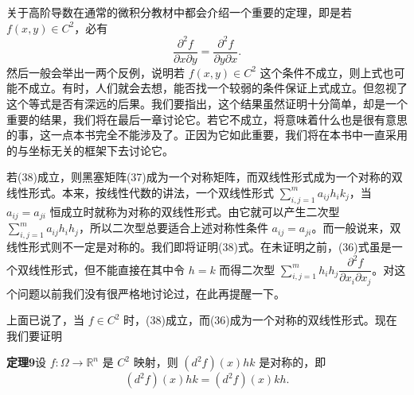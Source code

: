 关于高阶导数在通常的微积分教材中都会介绍一个重要的定理，即是若 $f(x,y)\in C^2$，必有
\begin{equation}
 \frac{\partial^2f}{\partial x\partial y}=\frac{\partial^2f}{\partial y\partial x}.
 \tag{38}
\end{equation}
然后一般会举出一两个反例，说明若 $f(x,y)\in C^2$ 这个条件不成立，则上式也可能不成立。有时，人们就会去想，能否找一个较弱的条件保证上式成立。但忽视了这个等式是否有深远的后果。我们要指出，这个结果虽然证明十分简单，却是一个重要的结果，我们将在最后一章讨论它。若它不成立，将意味着什么也是很有意思的事，这一点本书完全不能涉及了。正因为它如此重要，我们将在本书中一直采用的与坐标无关的框架下去讨论它。

若(38)成立，则黑塞矩阵(37)成为一个对称矩阵，而双线性形式成为一个对称的双线性形式。本来，按线性代数的讲法，一个双线性形式 $\sum_{i,j=1}^m a_{ij}h_i k_j$，当 $a_{ij}=a_{ji}$ 恒成立时就称为对称的双线性形式。由它就可以产生二次型 $\sum_{i,j=1}^m a_{ij}h_i h_j$，所以二次型总要适合上述对称性条件 $a_{ij}=a_{ji}$。而一般说来，双线性形式则不一定是对称的。我们即将证明(38)式。在未证明之前，(36)式虽是一个双线性形式，但不能直接在其中令 $h=k$ 而得二次型 $\sum_{i,j=1}^m h_i h_j\dfrac{\partial^2f}{\partial x_i\partial x_j}$。对这个问题以前我们没有很严格地讨论过，在此再提醒一下。

上面已说了，当 $f\in C^2$ 时，(38)成立，而(36)成为一个对称的双线性形式。现在我们要证明

\noindent\textbf{定理9}\quad 设 $f:\Omega\to\mathbb R^n$ 是 $C^2$ 映射，则 $(d^2f)(x)hk$ 是对称的，即
\[
 (d^2f)(x)hk=(d^2f)(x)kh.
\]

